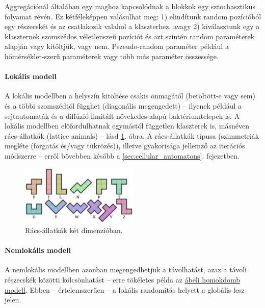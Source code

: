 \documentclass[12pt]{article}
\theoremstyle{plain}
\begin{document}
Aggregációnál általában egy maghoz kapcsolódnak a blokkok egy sztochasztikus folyamat révén. Ez kétféleképpen valósulhat meg: 1) elindítunk random pozícióból egy részecskét és az csatlakozik valahol a klaszterhez, avagy 2) kiválasztunk egy a klaszternek szomszédos véletlenszeű pozíciót és azt szintén random paraméterek alapján vagy kitöltjük, vagy nem. Pszeudo-random paraméter például a hőmérséklet-szerű paraméterek vagy több más paraméter összessége. \\

\paragraph{Lokális modell} A lokális modellben a helyszín kitöltése csakis önmagától (betöltött-e vagy sem) és a többi szomszédtól függhet (diagonális megengedett) -- ilyenek például a sejtautomaták és a diffúzió-limitált növekedés alapú baktériumtelepek is. A lokális modellben elöfordulhatnak egymástól független klaszterek is, másnéven rács-állatkák (lattice animals) -- lásd \ref{fig:lattice_animals}. ábra. A rács-állatkák típusa (szimmetriák megléte (forgatás és/vagy tükrözés)), illetve gyakorisága jellemző az iterációs módszerre -- erről bövebben később a \ref{sec:cellular_automatons}. fejezetben. 

\begin{figure}[H]
    \begin{center}
    \includegraphics[width=0.5\textwidth]{media/lattice_animals.png}
    \caption{Rács-állatkák két dimenzióban. } 
    \label{fig:lattice_animals}
    \end{center}
\end{figure}



\paragraph{Nemlokális modell}
A nemlokális modellben azonban megengedhetjük a távolhatást, azaz a távoli részecskék közötti kölcsönhatást -- erre tökéletes példa az \href{https://en.wikipedia.org/wiki/Abelian_sandpile_model}{ábeli homokdomb modell}. Ebben -- értelemszerűen -- a lokális randomitás helyett a globális lesz jelen. \\
\end{document}
